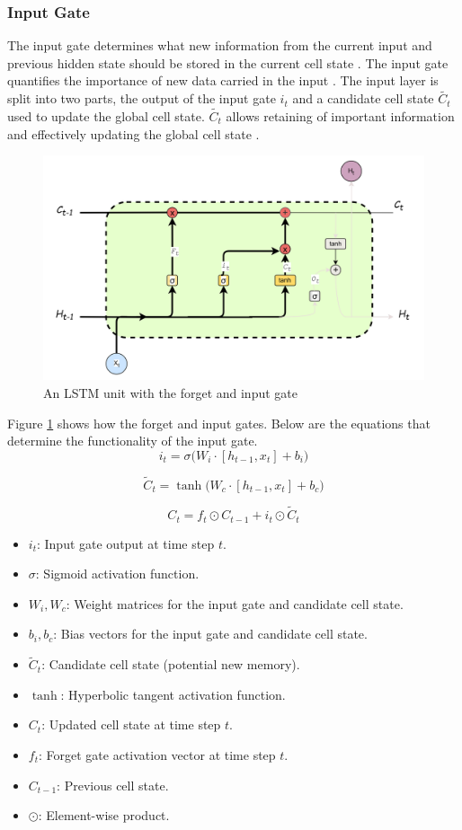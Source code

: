 
 \subsubsection{Input Gate}
 The input gate determines what new information from the current input and previous hidden state should be stored in the current cell state \cite{rafi2021short}. 
 The input gate quantifies the importance of new data carried in the input \cite{stryker_ibm_rnn}. The input layer is split into two parts, the output of the input gate $i_t$ and a candidate cell state $\tilde{C_t}$ used to update the global cell state. $\tilde{C_t}$ allows retaining of important information and effectively updating the global cell state \cite{zhu2025novel}.
\begin{figure}[h]
	\centering
	\includegraphics[width=0.7\linewidth]{Chapters/images/forget_inputgates}
	\caption{An LSTM unit with the forget and input gate }
	\label{fig:forgetinputgates}
\end{figure}

Figure \ref{fig:forgetinputgates} shows how the forget and input gates. Below are the equations that determine the functionality of the input gate. %
\[
i_t = \sigma \Big( W_i \cdot [h_{t-1}, x_t] + b_i \Big)
\tag{18}
\label{eqn:inputgate}
\]

\[
\tilde{C}_t = \tanh \Big( W_c \cdot [h_{t-1}, x_t] + b_c \Big)
\tag{19}
\label{eqn:candidatecell}
\]

\[
C_t = f_t \odot C_{t-1} + i_t \odot \tilde{C}_t
\tag{20}
\label{eqn:cellupdate}
\]

\begin{itemize}
	\item $i_t$: Input gate output at time step $t$.
	\item $\sigma$: Sigmoid activation function.
	\item $W_i, W_c$: Weight matrices for the input gate and candidate cell state.

	\item $b_i, b_c$: Bias vectors for the input gate and candidate cell state.
	\item $\tilde{C}_t$: Candidate cell state (potential new memory).
	\item $\tanh$: Hyperbolic tangent activation function.
	\item $C_t$: Updated cell state at time step $t$.
	\item $f_t$: Forget gate activation vector at time step $t$.
	\item $C_{t-1}$: Previous cell state.
	\item $\odot$: Element-wise product.
\end{itemize}

